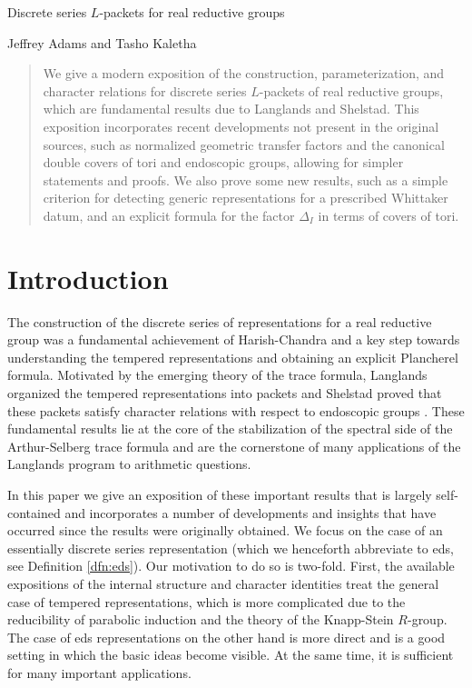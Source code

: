 \documentclass{article}
\theoremstyle{definition}
\numberwithin{equation}{section}
\renewcommand{\-}{\hyp{}}
\begin{document}
\begin{mytitle} Discrete series $L$\-packets for real reductive groups \end{mytitle}
\begin{center} Jeffrey Adams and Tasho Kaletha \end{center}

\begin{abstract}
We give a modern exposition of the construction, parameterization, and character relations for discrete series $L$\-packets of real reductive groups, which are fundamental results due to Langlands and Shelstad. This exposition incorporates recent developments not present in the original sources, such as normalized geometric transfer factors and the canonical double covers of tori and endoscopic groups, allowing for simpler statements and proofs. We also prove some new results, such as a simple criterion for detecting generic representations for a prescribed Whittaker datum, and an explicit formula for the factor $\Delta_I$ in terms of covers of tori.
\end{abstract}

\tableofcontents

\section{Introduction}

The construction of the discrete series of representations  for a real reductive group was a fundamental achievement of Harish-Chandra and a key step towards understanding the tempered representations and obtaining an explicit Plancherel formula. Motivated by the emerging theory of the trace formula, Langlands organized the tempered representations into packets \cite{Lan89} and Shelstad proved that these packets satisfy character relations with respect to endoscopic groups \cite{She82}. These fundamental results lie at the core of the stabilization of the spectral side of the Arthur-Selberg trace formula and are the cornerstone of many applications of the Langlands program to arithmetic questions. 

In this paper we give an exposition of these important results that is largely self-contained and incorporates a number of developments and insights that have occurred since the results were originally obtained. We focus on the case of an essentially discrete series representation (which we henceforth abbreviate to eds, see Definition \ref{dfn:eds}). Our motivation to do so is two-fold. First, the available expositions of the internal structure and character identities treat the general case of tempered representations, which is more complicated due to the reducibility of parabolic induction and the theory of the Knapp-Stein $R$-group. The case of eds representations on the other hand is more direct and is a good setting in which the basic ideas become visible. At the same time, it is sufficient for many important applications.
\end{document}
